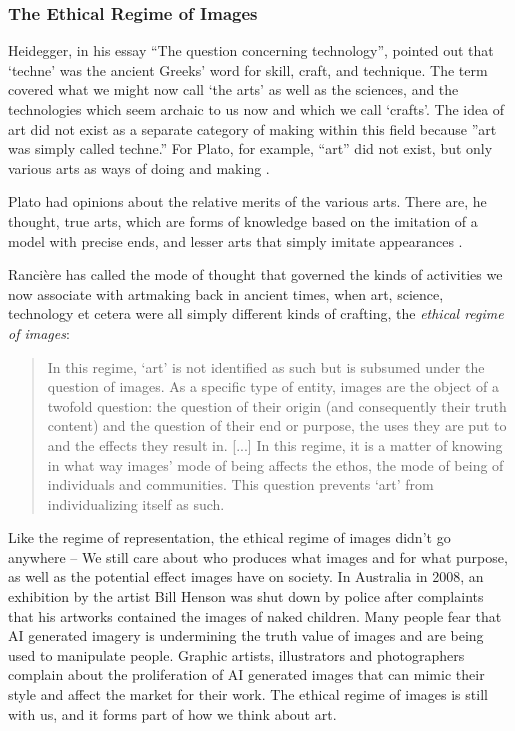 \documentclass[letterpaper]{article}
\begin{document}
    \subsubsection{The Ethical Regime of Images}

    Heidegger, in his essay “The question concerning technology”, pointed out that ‘techne’ was the ancient Greeks' word for skill, craft, and technique. The term covered what we might now call ‘the arts’ as well as the sciences, and the technologies which seem archaic to us now and which we call ‘crafts’. The idea of art did not exist as a separate category of making within this field because ”art was simply called techne.” \citep[p34]{HeideggerThQstnCncrngTchnlgy1954} For Plato, for example, “art” did not exist, but only various arts as ways of doing and making \citep[p.20]{RancierPltcsOfThAsthtcs2004}. 

    Plato had opinions about the relative merits of the various arts. There are, he thought, true arts, which are forms of knowledge based on the imitation of a model with precise ends, and lesser arts that simply imitate appearances \citep[p.20]{RancierPltcsOfThAsthtcs2004}.

    Rancière has called the mode of thought that governed the kinds of activities we now associate with artmaking back in ancient times, when art, science, technology et cetera were all simply different kinds of crafting, the \emph{ethical regime of images}:

    \begin{quote}
        In this regime, ‘art’ is not identified as such but is subsumed under the question of images. As a specific type of entity, images are the object of a twofold question: the question of their origin (and consequently their truth content) and the question of their end or purpose, the uses they are put to and the effects they result in. [...] In this regime, it is a matter of knowing in what way images' mode of being affects the ethos, the mode of being of individuals and communities. This question prevents ‘art’ from individualizing itself as such. \citep[pp.20-21]{RancierPltcsOfThAsthtcs2004}
    \end{quote}

    Like the regime of representation, the ethical regime of images didn't go anywhere – We still care about who produces what images and for what purpose, as well as the potential effect images have on society. In Australia in 2008, an exhibition by the artist Bill Henson was shut down by police after complaints that his artworks contained the images of naked children. Many people fear that AI generated imagery is undermining the truth value of images and are being used to manipulate people. Graphic artists, illustrators and photographers complain about the proliferation of AI generated images that can mimic their style and affect the market for their work. The ethical regime of images is still with us, and it forms part of how we think about art. 
\end{document}
